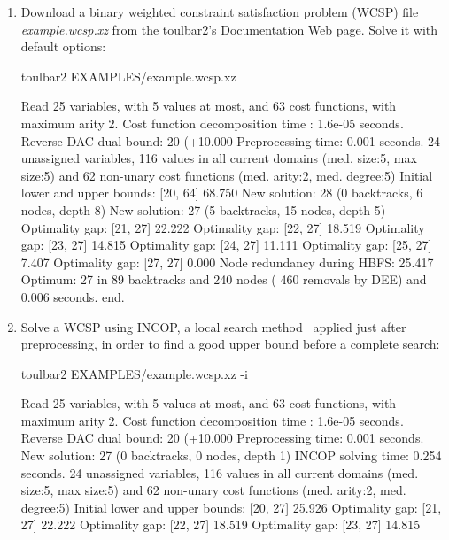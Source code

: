 \begin{enumerate}
\item Download a binary weighted constraint satisfaction problem (WCSP) file {\em example.wcsp.xz} from the toulbar2's Documentation Web page. Solve it with default options:
\begin{DoxyCode}
	toulbar2 EXAMPLES/example.wcsp.xz
\end{DoxyCode}
{\scriptsize
\begin{DoxyCode}
Read 25 variables, with 5 values at most, and 63 cost functions, with maximum arity 2.
Cost function decomposition time : 1.6e-05 seconds.
Reverse DAC dual bound: 20 (+10.000%
Preprocessing time: 0.001 seconds.
24 unassigned variables, 116 values in all current domains (med. size:5, max size:5) and 62 non-unary cost functions (med. arity:2, med. degree:5)
Initial lower and upper bounds: [20, 64] 68.750%
New solution: 28 (0 backtracks, 6 nodes, depth 8)
New solution: 27 (5 backtracks, 15 nodes, depth 5)
Optimality gap: [21, 27] 22.222 %
Optimality gap: [22, 27] 18.519 %
Optimality gap: [23, 27] 14.815 %
Optimality gap: [24, 27] 11.111 %
Optimality gap: [25, 27] 7.407 %
Optimality gap: [27, 27] 0.000 %
Node redundancy during HBFS: 25.417 %
Optimum: 27 in 89 backtracks and 240 nodes ( 460 removals by DEE) and 0.006 seconds.
end.
\end{DoxyCode}}
\item Solve a WCSP using INCOP, a local search method~\cite{idwalk:cp04} applied just after preprocessing, in order to find a good upper bound before a complete search:
\begin{DoxyCode}
	toulbar2 EXAMPLES/example.wcsp.xz -i
\end{DoxyCode}
{\scriptsize
\begin{DoxyCode}
Read 25 variables, with 5 values at most, and 63 cost functions, with maximum arity 2.
Cost function decomposition time : 1.6e-05 seconds.
Reverse DAC dual bound: 20 (+10.000%
Preprocessing time: 0.001 seconds.
New solution: 27 (0 backtracks, 0 nodes, depth 1)
INCOP solving time: 0.254 seconds.
24 unassigned variables, 116 values in all current domains (med. size:5, max size:5) and 62 non-unary cost functions (med. arity:2, med. degree:5)
Initial lower and upper bounds: [20, 27] 25.926%
Optimality gap: [21, 27] 22.222 %
Optimality gap: [22, 27] 18.519 %
Optimality gap: [23, 27] 14.815 %

\end{DoxyCode}}
\end{enumerate}
